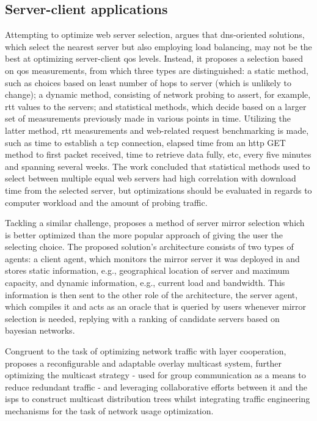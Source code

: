 \subsection{Server-client applications}

    Attempting to optimize web server selection, \cite{kenichi} argues that \gls{dns}-oriented solutions, which select the nearest server but also employing load balancing, may not be the best at optimizing server-client \gls{qos} levels.
    Instead, it proposes a selection based on \gls{qos} measurements, from which three types are distinguished: a static method, such as choices based on least number of hops to server (which is unlikely to change); a dynamic method, consisting of network probing to assert, for example, \gls{rtt} values to the servers; and statistical methods, which decide based on a larger set of measurements previously made in various points in time.
    Utilizing the latter method, \gls{rtt} measurements and web-related request benchmarking is made, such as time to establish a \gls{tcp} connection, elapsed time from an \gls{http} GET method to first packet received, time to retrieve data fully, etc, every five minutes and spanning several weeks.
    The work concluded that statistical methods used to select between multiple equal web servers had high correlation with download time from the selected server, but optimizations should be evaluated in regards to computer workload and the amount of probing traffic.

    Tackling a similar challenge, \cite{swain} proposes a method of server mirror selection which is better optimized than the more popular approach of giving the user the selecting choice.
    The proposed solution's architecture consists of two types of agents: a client agent, which monitors the mirror server it was deployed in and stores static information, e.g., geographical location of server and maximum capacity, and dynamic information, e.g., current load and bandwidth.
    This information is then sent to the other role of the architecture, the server agent, which compiles it and acts as an oracle that is queried by users whenever mirror selection is needed, replying with a ranking of candidate servers based on bayesian networks.

    Congruent to the task of optimizing network traffic with layer cooperation, \cite{adaptable-overlay} proposes a reconfigurable and adaptable overlay multicast system, further optimizing the multicast strategy - used for group communication as a means to reduce redundant traffic - and leveraging collaborative efforts between it and the \glspl{isp} to construct multicast distribution trees whilst integrating traffic engineering mechanisms for the task of network usage optimization.

